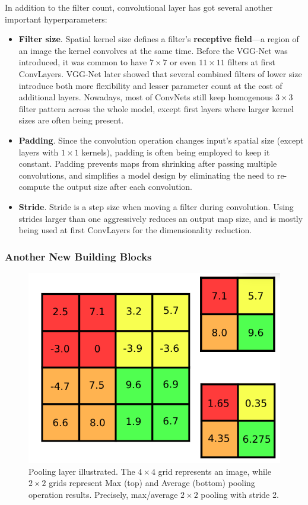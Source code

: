 \documentclass[thesis=B,english]{FITthesis}[2019/12/23]
\begin{document}
	In addition to the filter count, convolutional layer has got several another important hyperparameters:
	\begin{itemize}
		\item \textbf{Filter size}. Spatial kernel size defines a filter's \textbf{receptive field}---a region of an image the kernel convolves at the same time. Before the VGG-Net\cite{vgg} was introduced, it was common to have $7 \times 7$\cite{zfnet} or even $11 \times 11$\cite{alexnet} filters at first ConvLayers. VGG-Net later showed that several combined filters of lower size introduce both more flexibility and lesser parameter count at the cost of additional layers. Nowadays, most of ConvNets still keep homogenous $3 \times 3$ filter pattern across the whole model, except first layers where larger kernel sizes are often being present.
		\item \textbf{Padding}. Since the convolution operation changes input's spatial size (except layers with $1 \times 1$ kernels), padding is often being employed to keep it constant. Padding prevents maps from shrinking after passing multiple convolutions, and simplifies a model design by eliminating the need to re-compute the output size after each convolution.
		\item \textbf{Stride}. Stride is a step size when moving a filter during convolution. Using strides larger than one aggressively reduces an output map size, and is mostly being used at first ConvLayers for the dimensionality reduction.
	\end{itemize}
	
	\subsubsection{Another New Building Blocks}
	
	\begin{figure}[h]
		\centering
		\includegraphics[scale=0.5]{images/pool.png}
		\caption{Pooling layer illustrated. The $4 \times 4$ grid represents an image, while $2 \times 2$ grids represent Max (top) and Average (bottom) pooling operation results. Precisely, max/average $2 \times 2$ pooling with stride 2.}
	\end{figure}
	
\end{document}
